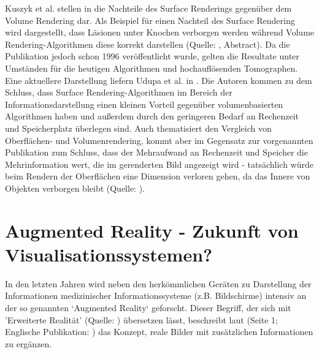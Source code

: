 \documentclass[a4paper,titlepage,12pt]{scrartcl}
\newtheorem[L]{boxedDefinition}{Definition}
\begin{document}
Kuszyk et al. stellen in \cite{Kuszyk1996} die Nachteile des Surface Renderings gegenüber dem Volume Rendering dar. Als Beispiel für einen Nachteil des Surface Rendering wird dargestellt, dass Läsionen unter Knochen verborgen werden während Volume Rendering-Algorithmen diese korrekt darstellen (Quelle: \cite{Kuszyk1996}, Abstract). Da die Publikation jedoch schon 1996 veröffentlicht wurde, gelten die Resultate unter Umständen für die heutigen Algorithmen und hochauflösenden Tomographen. Eine aktuellere Darstellung liefern Udupa et al. in \cite{Udupa2009}. Die Autoren kommen zu dem Schluss, dass Surface Rendering-Algorithmen im Bereich der Informationsdarstellung einen kleinen Vorteil gegenüber volumenbasierten Algorithmen haben und außerdem durch den geringeren Bedarf an Rechenzeit und Speicherplatz überlegen sind. Auch \cite{Bruckner2004} thematisiert den Vergleich von Oberflächen- und Volumenrendering, kommt aber im Gegensatz zur vorgenannten Publikation zum Schluss, dass der Mehraufwand an Rechenzeit und Speicher die Mehrinformation wert, die im gerenderten Bild angezeigt wird - tatsächlich würde beim Rendern der Oberflächen eine Dimension verloren gehen, da das Innere von Objekten verborgen bleibt (Quelle: \cite[Seite 2f.]{Bruckner2004}).

\section{Augmented Reality - Zukunft von Visualisationssystemen?}\label{sec:augmentedreality}
In den letzten Jahren wird neben den herkömmlichen Geräten zu Darstellung der Informationen medizinischer Informationssysteme (z.B. Bildschirme) intensiv an der so genannten `Augmented Reality` geforscht. Dieser Begriff, der sich mit 'Erweiterte Realität' (Quelle: \cite[Seite 1]{Toe2010}) übersetzen lässt, beschreibt laut \cite{Suthau2002DE} (Seite 1; Englische Publikation: \cite{Suthau2002}) das Konzept, reale Bilder mit zusätzlichen Informationen zu ergänzen.
\end{document}
